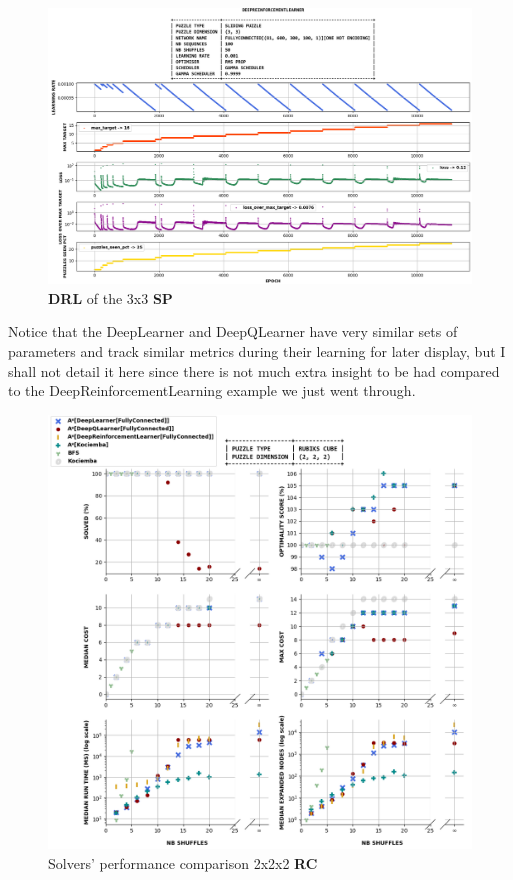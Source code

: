\begin{figure}[H]
\centering
\includegraphics[align=c, scale=0.42]{./Figures/33SPDeepReinforcementLearning}
\caption[33SPDeepReinforcementLearning]{\textbf{DRL} of the 3x3 \textbf{SP}}
\label{fig:33SPDeepReinforcementLearning}
\end{figure}

Notice that the DeepLearner and DeepQLearner have very similar sets of parameters and track similar metrics during their learning for later display, but I shall not detail it here since there is not much extra insight to be had compared to the DeepReinforcementLearning example we just went through.






\begin{figure}[H]
\centering
\includegraphics[scale=0.60]{./Figures/222RCPerformance}
\caption[222RCPerformance]{Solvers' performance comparison 2x2x2 \textbf{RC}}
\label{fig:222RCPerformance}
\end{figure}



